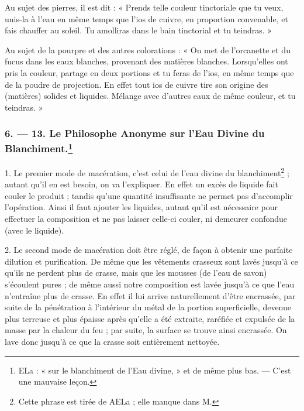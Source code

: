 \documentclass[a4paper, 11pt, oneside, polutonikogreek, french]{article}
\begin{document}
Au sujet des pierres, il est dit : « Prends telle couleur tinctoriale que tu veux, unis-la à l'eau en même temps que l'ios de cuivre, en proportion convenable, et fais chauffer au soleil. Tu amolliras dans le bain tinctorial et tu teindras. »

Au sujet de la pourpre et des autres colorations : « On met de l'orcanette et du fucus dans les eaux blanches, provenant des matières blanches. Lorsqu'elles ont pris la couleur, partage en deux portions et tu feras de l'ios, en même temps que de la poudre de projection. En effet tout ios de cuivre tire son origine des (matières) solides et liquides. Mélange avec d'autres eaux de même couleur, et tu teindras. »

\bigskip
\centerline{\EightStarTaper}
\centerline{\EightStarTaper\EightStarTaper}
\bigskip

\subsubsection[6. --- 13. Le Philosophe Anonyme sur l'Eau Divine du Blanchiment.]{6. --- 13. Le Philosophe Anonyme sur l'Eau Divine du Blanchiment.\footnote{ELa : « sur le blanchiment de l'Eau divine, » et de même plus bas. --- C'est une mauvaise leçon.}}

1. Le premier mode de macération, c'est celui de l'eau divine du blanchiment\footnote{Cette phrase est tirée de AELa ; elle manque dans M.} ; autant qu'il en est besoin, on va l'expliquer. En effet un excès de liquide fait couler le produit ; tandis qu'une quantité insuffisante ne permet pas d'accomplir l'opération. Ainsi il faut ajouter les liquides, autant qu'il est nécessaire pour effectuer la composition et ne pas laisser celle-ci couler, ni demeurer confondue (avec le liquide).

2. Le second mode de macération doit être réglé, de façon à obtenir une parfaite dilution et purification. De même que les vêtements crasseux sont lavés jusqu'à ce qu'ils ne perdent plus de crasse, mais que les mousses (de l'eau de savon) s'écoulent pures ; de même aussi notre composition est lavée jusqu'à ce que l'eau n'entraîne plus de crasse. En effet il lui arrive naturellement d'être encrassée, par suite de la pénétration à l'intérieur du métal de la portion superficielle, devenue plus terreuse et plus épaisse après qu'elle a été extraite, raréfiée et expulsée de la masse par la chaleur du feu ; par suite, la surface se trouve ainsi encrassée. On lave donc jusqu'à ce que la crasse soit entièrement nettoyée.
\end{document}
